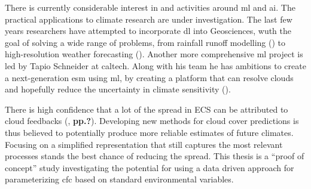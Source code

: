There is currently considerable interest in and activities around \acrfull{ml} and \acrshort{ai}. The practical applications to climate research are under investigation. The last few years researchers have attempted to incorporate \acrshort{dl} into Geosciences, wuth the goal of solving a wide range of problems, from rainfall runoff modelling (\cite{hess-23-5089-2019}) to  high-resolution weather forecasting (\cite{Rodrigues2018DeepDownscale:Forecast}). Another more comprehensive \acrshort{ml} project is led by Tapio Schneider at \acrfull{caltech}. Along with his team he has ambitions to create a next-generation \acrfull{esm} using \acrshort{ml}, by creating a platform that can resolve clouds and hopefully reduce the uncertainty in climate sensitivity (\cite{Voosen2018ScienceIntelligence}).

There is high confidence that a lot of the spread in ECS can be attributed to cloud feedbacks (\cite{IPCC_CH9_climate_models},\textbf{ pp.?}). Developing new methods for cloud cover predictions is thus believed to potentially produce more reliable estimates of future climates. Focusing on a simplified representation that still captures the most relevant processes stands the best chance of reducing the spread. This thesis is a ``proof of concept'' study investigating the potential for using a data driven approach for parameterizing \acrfull{cfc} based on standard environmental variables. 


